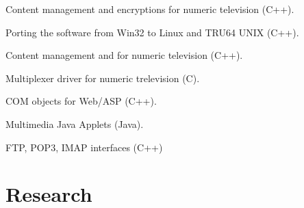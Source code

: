 \documentclass[a4paper]{deedy-resume} %
\begin{document}
\begin{minipage}[t]{0.66\textwidth}
\sectionspace %



\begin{tightitemize}
\item Content management and encryptions for numeric television (C++).
\item Porting the software from Win32 to Linux and TRU64 UNIX (C++).
\end{tightitemize}

\sectionspace %



\begin{tightitemize}
\item Content management and for numeric television (C++).
\item Multiplexer driver for numeric trelevision (C).
\end{tightitemize}

\sectionspace %



\begin{tightitemize}
\item COM objects for Web/ASP (C++).
\item Multimedia Java Applets (Java).
\item FTP, POP3, IMAP interfaces (C++)
\end{tightitemize}

\sectionspace %


\section{Research}



\end{minipage}
\end{document}

